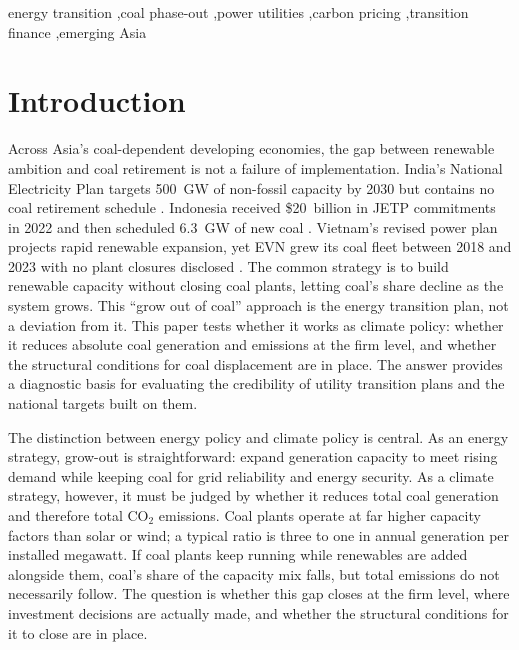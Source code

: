 \documentclass[review,3p,authoryear]{elsarticle}
\begin{document}
\begin{frontmatter}
\begin{keyword}
energy transition \sep coal phase-out \sep power utilities \sep carbon pricing \sep transition finance \sep emerging Asia
\end{keyword}

\end{frontmatter}

\section{Introduction}

Across Asia's coal-dependent developing economies, the gap between renewable ambition and coal retirement is not a failure of implementation. India's National Electricity Plan targets 500~GW of non-fossil capacity by 2030 but contains no coal retirement schedule \citep{CEA2023}. Indonesia received \$20~billion in JETP commitments in 2022 and then scheduled 6.3~GW of new coal \citep{Ashurst2025}. Vietnam's revised power plan projects rapid renewable expansion, yet EVN grew its coal fleet between 2018 and 2023 with no plant closures disclosed \citep{GIGA2024}. The common strategy is to build renewable capacity without closing coal plants, letting coal's share decline as the system grows. This ``grow out of coal'' approach is the energy transition plan, not a deviation from it. This paper tests whether it works as climate policy: whether it reduces absolute coal generation and emissions at the firm level, and whether the structural conditions for coal displacement are in place. The answer provides a diagnostic basis for evaluating the credibility of utility transition plans and the national targets built on them.

The distinction between energy policy and climate policy is central. As an energy strategy, grow-out is straightforward: expand generation capacity to meet rising demand while keeping coal for grid reliability and energy security. As a climate strategy, however, it must be judged by whether it reduces total coal generation and therefore total CO$_2$ emissions. Coal plants operate at far higher capacity factors than solar or wind; a typical ratio is three to one in annual generation per installed megawatt. If coal plants keep running while renewables are added alongside them, coal's share of the capacity mix falls, but total emissions do not necessarily follow. The question is whether this gap closes at the firm level, where investment decisions are actually made, and whether the structural conditions for it to close are in place.
\end{document}

